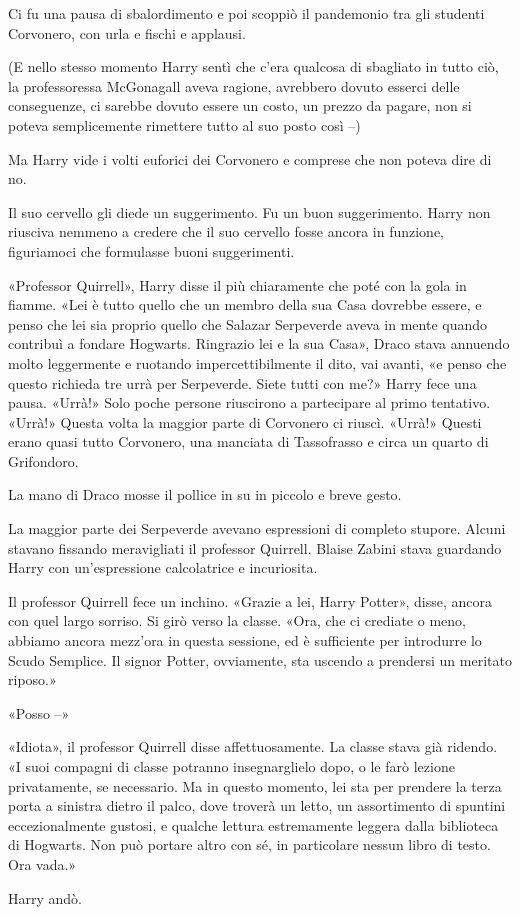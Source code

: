 Ci fu una pausa di sbalordimento e poi scoppiò il pandemonio tra gli studenti Corvonero, con urla e fischi e applausi.

(E nello stesso momento Harry sentì che c’era qualcosa di sbagliato in tutto ciò, la professoressa McGonagall aveva ragione, avrebbero dovuto esserci delle conseguenze, ci sarebbe dovuto essere un costo, un prezzo da pagare, non si poteva semplicemente rimettere tutto al suo posto così –)

Ma Harry vide i volti euforici dei Corvonero e comprese che non poteva dire di no.

Il suo cervello gli diede un suggerimento. Fu un buon suggerimento. Harry non riusciva nemmeno a credere che il suo cervello fosse ancora in funzione, figuriamoci che formulasse buoni suggerimenti.

«Professor Quirrell», Harry disse il più chiaramente che poté con la gola in fiamme. «Lei è tutto quello che un membro della sua Casa dovrebbe essere, e penso che lei sia proprio quello che Salazar Serpeverde aveva in mente quando contribuì a fondare Hogwarts. Ringrazio lei e la sua Casa», Draco stava annuendo molto leggermente e ruotando impercettibilmente il dito, vai avanti, «e penso che questo richieda tre urrà per Serpeverde. Siete tutti con me?» Harry fece una pausa. «Urrà!» Solo poche persone riuscirono a partecipare al primo tentativo. «Urrà!» Questa volta la maggior parte di Corvonero ci riuscì. «Urrà!» Questi erano quasi tutto Corvonero, una manciata di Tassofrasso e circa un quarto di Grifondoro.

La mano di Draco mosse il pollice in su in piccolo e breve gesto.

La maggior parte dei Serpeverde avevano espressioni di completo stupore. Alcuni stavano fissando meravigliati il professor Quirrell. Blaise Zabini stava guardando Harry con un’espressione calcolatrice e incuriosita.

Il professor Quirrell fece un inchino. «Grazie a lei, Harry Potter», disse, ancora con quel largo sorriso. Si girò verso la classe. «Ora, che ci crediate o meno, abbiamo ancora mezz’ora in questa sessione, ed è sufficiente per introdurre lo Scudo Semplice. Il signor Potter, ovviamente, sta uscendo a prendersi un meritato riposo.»

«Posso –»

«Idiota», il professor Quirrell disse affettuosamente. La classe stava già ridendo. «I suoi compagni di classe potranno insegnarglielo dopo, o le farò lezione privatamente, se necessario. Ma in questo momento, lei sta per prendere la terza porta a sinistra dietro il palco, dove troverà un letto, un assortimento di spuntini eccezionalmente gustosi, e qualche lettura estremamente leggera dalla biblioteca di Hogwarts. Non può portare altro con sé, in particolare nessun libro di testo. Ora vada.»

Harry andò.




